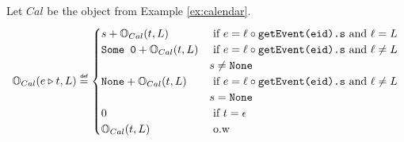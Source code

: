 \documentclass[acmsmall,screen,review, nonacm]{acmart}
\begin{document}
\begin{example}  \label{ex4}
  Let $\mathit{Cal}$ be the  object from Example \ref{ex:calendar}.
  \[
  \ob{e \tracecat t }{Cal}{L} \isdef \begin{cases}
    s + \ob{t}{Cal}{L}  & \mbox{ if } e = \event{\ell}{\mycode{getEvent(eid).s}} \text{ and } \ell = L \\
    \mycode{Some 0} + \ob{t}{Cal}{L}  & \mbox{ if } e = \event{\ell}{\mycode{getEvent(eid).s}} \text{ and } \ell \ne L \\
    & s \ne \mycode{None} \\
    \mycode{None} + \ob{t}{Cal}{L} & \mbox{ if } e = \event{\ell}{\mycode{getEvent(eid).s}} \text{ and } \ell \ne L \\
    & s = \mycode{None} \\
    0 & \mbox{ if } t = \epsilon \\
    \ob{t}{Cal}{L} & \mbox{ o.w } 
  \end{cases}
  \]
\end{example}


\begin{definition}\label{def:ni2}

  \mytodo{\dots}
  
\end{definition}





\end{document}
